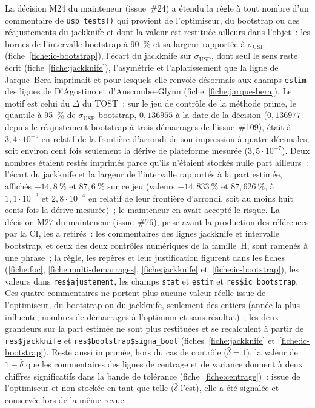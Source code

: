 \documentclass[a4paper,11pt]{article}
\newcommand{\code}[1]{\texttt{\small #1}}
\begin{document}
La décision M24 du mainteneur (issue~\#24) a étendu la règle à tout nombre d'un commentaire de
\code{usp\_tests()} qui provient de l'optimiseur, du bootstrap ou des réajustements du jackknife
et dont la valeur est restituée ailleurs dans l'objet~: les bornes de l'intervalle bootstrap à
90~\% et sa largeur rapportée à $\sigma_{\mathrm{USP}}$ (fiche~\ref{fiche:ic-bootstrap}), l'écart
du jackknife sur $\sigma_{\mathrm{USP}}$, dont seul le sens reste écrit
(fiche~\ref{fiche:jackknife}), l'asymétrie et l'aplatissement que la ligne de Jarque--Bera
imprimait et pour lesquels elle renvoie désormais aux champs \code{estim} des lignes de
D'Agostino et d'Anscombe--Glynn (fiche~\ref{fiche:jarque-bera}). Le motif est celui du
$\Delta$ du TOST~: sur le jeu de contrôle de la méthode prime, le quantile à 95~\% de
$\sigma_{\mathrm{USP}}$ bootstrap, $0{,}136955$ à la date de la décision ($0{,}136977$ depuis le
réajustement bootstrap à trois démarrages de l'issue~\#109), était à $3{,}4\cdot 10^{-5}$ en relatif de la
frontière d'arrondi de son impression à quatre décimales, soit environ cent fois seulement la
dérive de plateforme mesurée ($3{,}5\cdot 10^{-7}$). Deux nombres étaient restés imprimés
parce qu'ils n'étaient stockés nulle part ailleurs~: l'écart du jackknife et la largeur de
l'intervalle rapportés à la part estimée, affichés $-14{,}8~\%$ et $87{,}6~\%$ sur ce jeu
(valeurs $-14{,}833~\%$ et $87{,}626~\%$, à $1{,}1\cdot 10^{-3}$ et $2{,}8\cdot 10^{-4}$ en
relatif de leur frontière d'arrondi, soit au moins huit cents fois la dérive mesurée)~; le
mainteneur en avait accepté le risque. La décision M27 du mainteneur (issue~\#76), prise avant
la production des références par la CI, les a retirés~: les commentaires des lignes jackknife
et intervalle bootstrap, et ceux des deux contrôles numériques de la famille~H, sont ramenés à
une phrase~; la règle, les repères et leur justification figurent dans les fiches
(\ref{fiche:foc}, \ref{fiche:multi-demarrages}, \ref{fiche:jackknife}
et~\ref{fiche:ic-bootstrap}), les valeurs dans \code{res\$ajustement}, les champs
\code{stat} et \code{estim} et \code{res\$ic\_bootstrap}. Ces quatre commentaires ne portent
plus aucune valeur réelle issue de l'optimiseur, du bootstrap ou du jackknife, seulement des entiers
(année la plus influente, nombres de démarrages à l'optimum et sans résultat)~; les deux
grandeurs sur la part estimée ne sont plus restituées et se recalculent à partir de
\code{res\$jackknife} et \code{res\$bootstrap\$sigma\_boot} (fiches~\ref{fiche:jackknife}
et~\ref{fiche:ic-bootstrap}). Reste aussi imprimée, hors du cas de contrôle ($\hat\delta = 1$), la valeur de
$1 - \hat\delta$ que les commentaires des lignes de centrage et de variance donnent à deux
chiffres significatifs dans la bande de tolérance (fiche~\ref{fiche:centrage})~: issue de
l'optimiseur et non stockée en tant que telle ($\hat\delta$ l'est), elle a été signalée et
conservée lors de la même revue.
\end{document}
